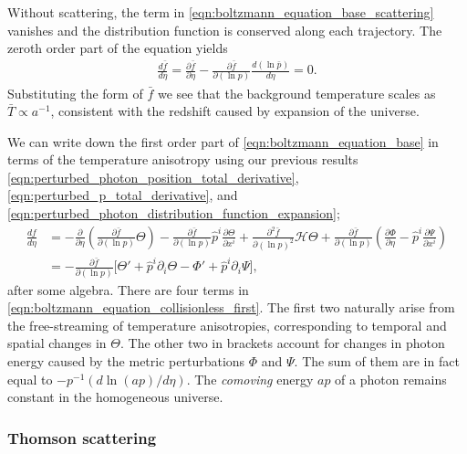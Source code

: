 Without scattering, the term in \eqref{eqn:boltzmann_equation_base_scattering} vanishes and the distribution function is conserved along each trajectory. The zeroth order part of the equation yields
\begin{align}
	\frac{d\bar{f}}{d\eta} = \frac{\partial \bar{f}}{\partial\eta} - \frac{\partial \bar{f}}{\partial(\ln p)}\frac{d(\ln\bar{p})}{d\eta} = 0. \label{eqn:boltzmann_equation_collisionless_zeroth}
\end{align}
Substituting the form of $\bar{f}$ we see that the background temperature scales as $\bar{T}\propto a^{-1}$, consistent with the redshift caused by expansion of the universe.

We can write down the first order part of \eqref{eqn:boltzmann_equation_base} in terms of the temperature anisotropy using our previous results \eqref{eqn:perturbed_photon_position_total_derivative}, \eqref{eqn:perturbed_p_total_derivative}, and \eqref{eqn:perturbed_photon_distribution_function_expansion};
\begin{align}
	\frac{df}{d\eta} &= - \frac{\partial}{\partial\eta} \left( \frac{\partial \bar{f}}{\partial(\ln p)} \Theta \right) - \frac{\partial \bar{f}}{\partial (\ln p)} \hat{p}^i \frac{\partial \Theta}{\partial x^i} +  \frac{\partial^2 \bar{f}}{\partial(\ln p)^2} \mathcal{H}\Theta + \frac{\partial \bar{f}}{\partial (\ln p)} \left( \frac{\partial \Phi}{\partial \eta} - \hat{p}^i \frac{\partial \Psi}{\partial x^i} \right) \\
	&= - \frac{\partial \bar{f}}{\partial (\ln p)} \biggl[ \Theta' + \hat{p}^i \partial_i \Theta - \Phi' + \hat{p}^i \partial_i \Psi \biggr], \label{eqn:boltzmann_equation_collisionless_first}
\end{align}
after some algebra. There are four terms in \eqref{eqn:boltzmann_equation_collisionless_first}. The first two naturally arise from the free-streaming of temperature anisotropies, corresponding to temporal and spatial changes in $\Theta$. The other two in brackets account for changes in photon energy caused by the metric perturbations $\Phi$ and $\Psi$. The sum of them are in fact equal to $-p^{-1}(d \ln(ap)/d\eta)$. The \textit{comoving} energy $ap$ of a photon remains constant in the homogeneous universe.


\subsubsection*{Thomson scattering} \label{section:thompson_scattering}

